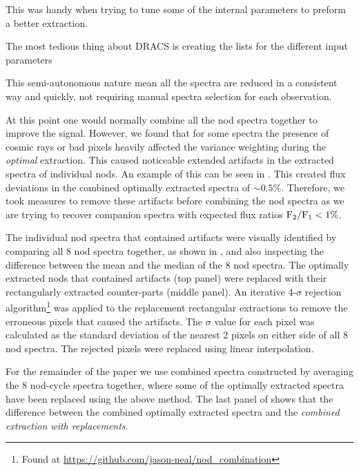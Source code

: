 This was handy when trying to tune some of the internal parameters to preform a better extraction.


The most tedious thing about DRACS is creating the lists for the different input parameters

This semi-autonomous nature mean all the spectra are reduced in a consistent way and quickly, not requiring manual spectra selection for each observation.

At this point one would normally combine all the nod spectra together to improve the signal. However, we found that for some spectra the presence of cosmic rays or bad pixels heavily affected the variance weighting during the \emph{optimal} extraction. This caused noticeable extended artifacts in the extracted spectra of individual nods. An example of this can be seen in . This created flux deviations in the combined optimally extracted spectra of \(\sim 0.5\% \).  Therefore, we took measures to remove these artifacts before combining the nod spectra as we are trying to recover companion spectra with expected flux ratios \(\rm {F_2}/{F_1} < 1\% \). 

The individual nod spectra that contained artifacts were visually identified by comparing all 8 nod spectra together, as shown in , and also inspecting the difference between the mean and the median of the 8 nod spectra. The optimally extracted nods that contained artifacts (top panel) were replaced with their rectangularly extracted counter-parts (middle panel). An iterative 4-\(\sigma \) rejection algorithm\footnote{Found at \url{https://github.com/jason-neal/nod_combination}} was applied to the replacement rectangular extractions to remove the erroneous pixels that caused the artifacts. The \(\sigma\) value for each pixel was calculated as the standard deviation of the nearest 2 pixels on either side of all 8 nod spectra. The rejected pixels were replaced using linear interpolation.

For the remainder of the paper we use combined spectra constructed by averaging the 8 nod-cycle spectra together, where some of the optimally extracted spectra have been replaced using the above method. The last panel of  shows that the difference between the combined optimally extracted spectra and the \emph{combined extraction with replacements}.

